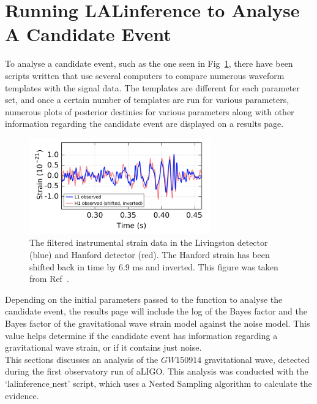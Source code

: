 \documentclass{article}
\begin{document}
 \newpage
 \section{Running LALinference to Analyse A Candidate Event}
 
 To analyse a candidate event, such as the one seen in Fig~\ref{Fig:DataLH}, there have been scripts written that use several computers to compare numerous waveform templates with the signal data. The templates are different for each parameter set, and once a certain number of templates are run for various parameters, numerous plots of posterior destinies for various parameters along with other information regarding the candidate event are displayed on a results page. \\
 
 
 
 \begin{figure}[h]
 	\centering
 	\includegraphics[width=0.7\textwidth]{Figures/DataLH.png} 
 	\caption{The filtered instrumental strain data in the Livingston detector (blue) and Hanford detector (red). The Hanford strain has been shifted back in time by 6.9 ms and inverted. This figure was taken from Ref~\cite{ligo2016properties}.
 	}
 	\label{Fig:DataLH}
 \end{figure}
 
 
 Depending on the initial parameters passed to the function to analyse the candidate event, the results page will include the log of the Bayes factor and the Bayes factor of the gravitational wave strain model against the noise model. This value helps determine if the candidate event has information regarding a gravitational wave strain, or if it contains just noise. \\
 
 
 This sections discusses an analysis of the $GW150914$ gravitational wave, detected during the first observatory run of aLIGO. This analysis was conducted with the `lalinference$\_$nest' script, which uses a Nested Sampling algorithm to calculate the evidence. \\
 
\end{document}
